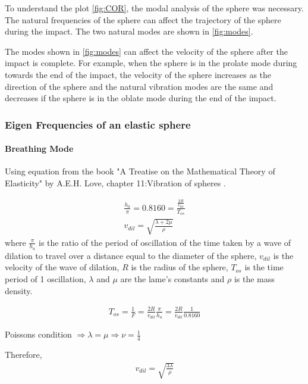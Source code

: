To understand the plot \ref{fig:COR}, the modal analysis of the sphere was necessary. The natural frequencies of the sphere can affect the trajectory of the sphere during the impact. The two natural modes are shown in \ref{fig:modes}.

The modes shown in \ref{fig:modes} can affect the velocity of the sphere after the impact is complete. For example, when the sphere is in the prolate mode during towards the end of the impact, the velocity of the sphere increases as the direction of the sphere and the natural vibration modes are the same and decreases if the sphere is in the oblate mode during the end of the impact. 

\subsubsection{Eigen Frequencies of an elastic sphere}

\paragraph{Breathing Mode}

Using equation from the book "A Treatise on the Mathematical Theory of Elasticity" by A.E.H. Love, chapter 11:Vibration of spheres \citep{aelove}.

\begin{equation}
\begin{split}
\frac{h_{a}}{\pi} = 0.8160 = \frac{\frac{2R}{v_{dil}}}{T_{os}}\\
v_{dil} = \sqrt{\frac{\lambda + 2\mu}{\rho}}
\end{split}
\label{eq:eigen}
\end{equation} 
where $\frac{\pi}{h_{a}}$ is the ratio of the period of oscillation of the time taken by a wave of dilation to travel over a  distance equal to the diameter of the sphere, $v_{dil}$ is the velocity of the wave of dilation, $R$ is the radius of the sphere, $T_{os}$ is the time period of 1 oscillation, $\lambda$ and $\mu$ are the lame's constants and $\rho$ is the mass density.

\begin{align}
T_{os} = \frac{1}{F} = \frac{2R}{v_{dil}} \frac{\pi}{h_{a}} = \frac{2R}{v_{dil}} \frac{1}{0.8160}
\end{align}

Poissons condition $\Rightarrow \lambda = \mu \Rightarrow \nu=\frac{1}{4}$

Therefore,
\begin{align}
 v_{dil} = \sqrt{\frac{3\lambda}{\rho}}
\end{align}

